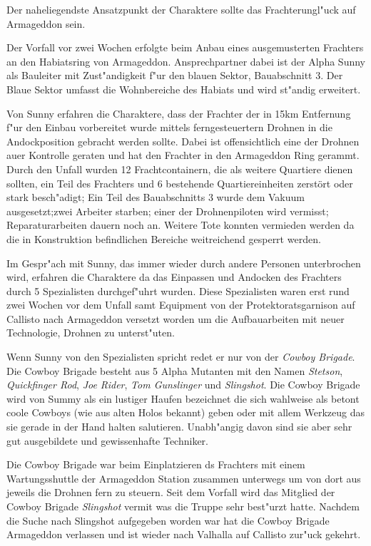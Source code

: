 
Der naheliegendste Ansatzpunkt der Charaktere sollte das Frachterungl"uck auf Armageddon sein.

Der Vorfall vor zwei Wochen erfolgte beim Anbau eines ausgemusterten Frachters an den Habiatsring von Armageddon. Ansprechpartner dabei ist der Alpha Sunny als Bauleiter mit Zust"andigkeit f"ur den blauen Sektor, Bauabschnitt 3. Der Blaue Sektor umfasst die Wohnbereiche des Habiats und wird st"andig erweitert.

Von Sunny erfahren die Charaktere, dass der Frachter der in 15km Entfernung f"ur den Einbau vorbereitet wurde mittels ferngesteuertern Drohnen in die Andockposition gebracht werden sollte. Dabei ist offensichtlich eine der Drohnen au\3er Kontrolle geraten und hat den Frachter in den Armageddon Ring gerammt. Durch den Unfall wurden 12 Frachtcontainern, die als weitere Quartiere dienen sollten, ein Teil des Frachters und 6 bestehende Quartiereinheiten zerstört oder stark besch"adigt; Ein Teil des Bauabschnitts 3 wurde dem Vakuum ausgesetzt;zwei Arbeiter starben; einer der Drohnenpiloten wird vermisst; Reparaturarbeiten dauern noch an. Weitere Tote konnten vermieden werden da die in Konstruktion befindlichen Bereiche weitreichend gesperrt werden.

Im Gespr"ach mit Sunny, das immer wieder durch andere Personen unterbrochen wird, erfahren die Charaktere da\3 das Einpassen und Andocken des Frachters durch 5 Spezialisten durchgef"uhrt wurden. Diese Spezialisten waren erst rund zwei Wochen vor dem Unfall samt Equipment von  der Protektoratsgarnison auf Callisto nach Armageddon versetzt worden um die Aufbauarbeiten mit neuer Technologie, Drohnen zu unterst"uten.

Wenn Sunny von den Spezialisten spricht redet er nur von der \emph{Cowboy Brigade}. Die Cowboy Brigade besteht aus 5 Alpha Mutanten mit den Namen \emph{Stetson}, \emph{Quickfinger Rod}, \emph{Joe Rider}, \emph{Tom Gunslinger} und \emph{Slingshot}. Die Cowboy Brigade wird von Summy als ein lustiger Haufen bezeichnet die sich wahlweise als betont coole Cowboys (wie aus alten Holos bekannt) geben oder mit allem Werkzeug das sie gerade in der Hand halten salutieren. Unabh"angig davon sind sie aber sehr gut ausgebildete und gewissenhafte Techniker.

Die Cowboy Brigade war beim Einplatzieren ds Frachters mit einem Wartungsshuttle der Armageddon Station zusammen unterwegs um von dort aus jeweils die Drohnen fern zu steuern. Seit dem Vorfall wird das Mitglied der Cowboy Brigade \emph{Slingshot} vermi\3t was die Truppe sehr best"urzt hatte. Nachdem die Suche nach Slingshot aufgegeben worden war hat die Cowboy Brigade Armageddon verlassen und ist wieder nach Valhalla auf Callisto zur"uck gekehrt.

